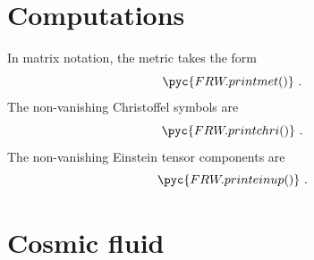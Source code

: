 \section{Computations}

    In matrix notation, the metric takes the form 
    \begin{equation*}
        \pyc{FRW.printmet()} ~.
    \end{equation*}
    The non-vanishing Christoffel symbols are 
    \begin{equation*}
        \pyc{FRW.printchri()} ~.
    \end{equation*}
    The non-vanishing Einstein tensor components are 
    \begin{equation*}
        \pyc{FRW.printeinup()} ~.
    \end{equation*}

\section{Cosmic fluid}

